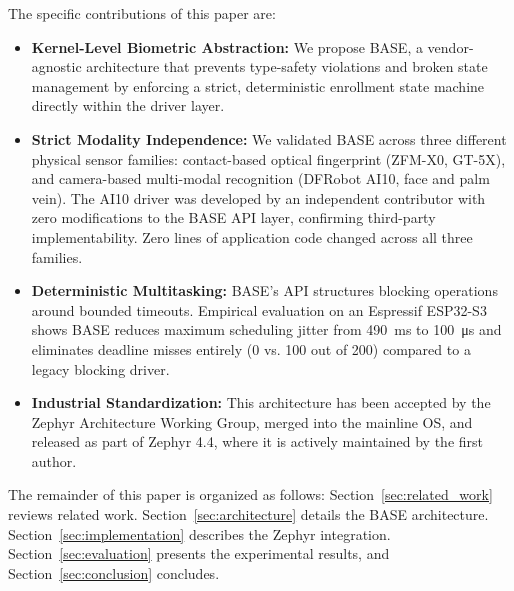 The specific contributions of this paper are:
\begin{itemize}
    \item \textbf{Kernel-Level Biometric Abstraction:} We propose BASE, a vendor-agnostic architecture that prevents type-safety violations and broken state management by enforcing a strict, deterministic enrollment state machine directly within the driver layer.
    \item \textbf{Strict Modality Independence:} We validated BASE across three different physical sensor families: contact-based optical fingerprint (ZFM-X0, GT-5X), and camera-based multi-modal recognition (DFRobot AI10, face and palm vein). The AI10 driver was developed by an independent contributor with zero modifications to the BASE API layer, confirming third-party implementability. Zero lines of application code changed across all three families.
    \item \textbf{Deterministic Multitasking:} BASE's API structures blocking operations around bounded timeouts. Empirical evaluation on an Espressif ESP32-S3 shows BASE reduces maximum scheduling jitter from \SI{490}{\milli\second} to \SI{100}{\micro\second} and eliminates deadline misses entirely (0 vs. 100 out of 200) compared to a legacy blocking driver.
    \item \textbf{Industrial Standardization:} This architecture has been accepted by the Zephyr Architecture Working Group, merged into the mainline OS, and released as part of Zephyr 4.4\cite{zephyr_biometrics, zephyr_pr, zephyr_44_notes}, where it is actively maintained by the first author.
\end{itemize}

The remainder of this paper is organized as follows: Section~\ref{sec:related_work} reviews related work. Section~\ref{sec:architecture} details the BASE architecture. Section~\ref{sec:implementation} describes the Zephyr integration. Section~\ref{sec:evaluation} presents the experimental results, and Section~\ref{sec:conclusion} concludes.
